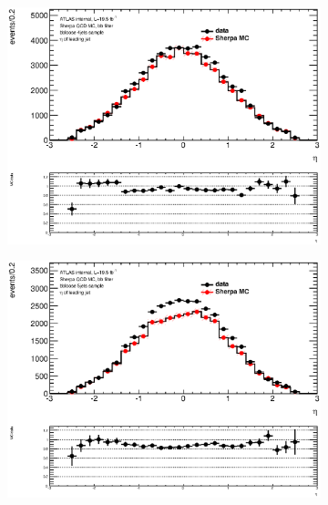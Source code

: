 \begin{figure}[phtb!]
\begin{center}
  \begin{subfigure}[$bbloose$ 4 jet category]{0.3\textwidth}\includegraphics[width=\textwidth]{MonteCarlo/figures/eta0_bbloose_4jets.eps}\end{subfigure}
  \begin{subfigure}[$bbloose$ 5+ jet category]{0.3\textwidth}\includegraphics[width=\textwidth]{MonteCarlo/figures/eta0_bbloose_5jets.eps}\end{subfigure}

\end{center}
\end{figure}
